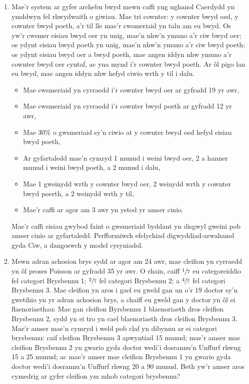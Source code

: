 \documentclass[12pt]{article}
\begin{document}
\begin{enumerate}
  \item Mae'r system ar gyfer archebu bwyd mewn caffi yng nghanol Caerdydd yn ymddwyn fel rhwydwaith o giwiau. Mae tri cownter: y cownter bwyd oed, y cownter bwyd poeth, a'r til lle mae'r cwsmeriaid yn talu am eu bwyd. Os yw'r cwsmer eisiau bwyd oer yn unig, mae'n nhw'n ymuno a'r ciw bwyd oer; os ydynt eisiau bwyd poeth yn unig, mae'n nhw'n ymuno a'r ciw bwyd poeth; os ydynt eisiau bwyd oer a bwyd poeth, mae angen iddyn nhw ymuno a'r cownter bwyd oer cyntaf, ac yna mynd i'r cownter bwyd poeth. Ar ôl pigo lan eu bwyd, mae angen iddyn nhw hefyd ciwio wrth y til i dalu.
  \begin{itemize}
    \item Mae cwsmeriaid yn cyrraedd i'r cownter bwyd oer ar gyfradd 19 yr awr,
    \item Mae cwsmeriaid yn cyrraedd i'r cownter bwyd poeth ar gyfradd 12 yr awr,
    \item Mae 30\% o gwsmeriaid sy'n ciwio at y cownter bwyd oed hefyd eisiau bwyd poeth,
    \item Ar gyfartaledd mae'n cymryd 1 munud i weini bwyd oer, 2 a hanner munud i weini bwyd poeth, a 2 munud i dalu,
    \item Mae 1 gweinydd wrth y cownter bwyd oer, 2 weinydd wrth y cownter bwyd poerth, a 2 weinydd wrth y til,
    \item Mae'r caffi ar agor am 3 awr yn ystod yr amser cinio.
  \end{itemize}

  Mae'r caffi eisiau gwybod faint o gwsmeriaid byddant yn disgwyl gweini pob amser cinio ar gyfartaledd. Perfformiwch efelychiad digwyddiad-arwahanol gyda Ciw, a dangoswch y model cysyniadol.

  \vspace{10mm}

  \item Mewn adran achosion brys sydd ar agor am 24 awr, mae cleifion yn cyrraedd yn ôl proses Poisson ar gyfradd 35 yr awr. O rhain, caiff $\sfrac{1}{7}$ eu categoreiddio fel categori Brysbennu 1; $\sfrac{2}{7}$ fel categori Brysbennu 2; a $\sfrac{4}{7}$ fel categori Brysbennu 3. Mae cleifion yn aros i gael eu gweld gan un o'r 19 doctor sy'n gwetihio yn yr adran achosion brys, a chaiff eu gweld gan y doctor yn ôl ei flaenoriaethau: Mae gan cleifion Byrsbennu 1 blaenoriaeth dros cleifion Brysbennu 2, sydd yn ei tro yn cael blaenoriaeth dros cleifion Brysbennu 3. Mae'r amser mae'n cymryd i weld pob claf yn dibynnu ar ei categori brysbennu: caif cleifion Brysbennu 3 apwyntiad 15 munud; mae'r amser mae cleifion Brysbennu 2 yn gwario gyda doctor wedi'i dosrannu'n Unffurf rhwng 15 a 25 munud; ac mae'r amser mae cleifion Brysbennu 1 yn gwario gyda doctor wedi'i dosrannu'n Unffurf rhwng 20 a 90 munud. Beth yw'r amser aros cymedrig ar gyfer cleifion ym mhob categori brysbennu?

\end{enumerate}
\end{document}
